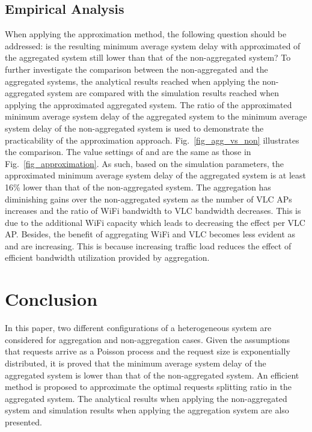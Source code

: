 \documentclass[10pt,journal]{IEEEtran}
\begin{document}
\subsection{Empirical Analysis}
When applying the approximation method, the following question should be addressed: is the resulting minimum average system delay with approximated  of the aggregated system still lower than that of the non-aggregated system? To further investigate the comparison between the non-aggregated and the aggregated systems, the analytical results reached when applying the non-aggregated system are compared with the simulation results reached when applying the approximated aggregated system. The ratio of the approximated minimum average system delay of the aggregated system to the minimum average system delay of the non-aggregated system is used to demonstrate the practicability of the approximation approach. Fig.~\ref{fig_agg_vs_non} illustrates the comparison. The value settings of  and  are the same as those in Fig.~\ref{fig_approximation}. As such, based on the simulation parameters, the approximated minimum average system delay of the aggregated system is at least 16\% lower than that of the non-aggregated system. The aggregation has diminishing gains over the non-aggregated system as the number of VLC APs increases and the ratio of WiFi bandwidth to VLC bandwidth decreases. This is due to the additional WiFi capacity which leads to decreasing the effect per VLC AP. Besides, the benefit of aggregating WiFi and VLC becomes less evident as  and  are increasing. This is because increasing traffic load reduces the effect of efficient bandwidth utilization provided by aggregation.

\section{Conclusion}\label{sec4}
In this paper, two different configurations of a heterogeneous system are considered for aggregation and non-aggregation cases. Given the assumptions that requests arrive as a Poisson process and the request size is exponentially distributed, it is proved that the minimum average system delay of the aggregated system is lower than that of the non-aggregated system. An efficient method is proposed to approximate the optimal requests splitting ratio in the aggregated system. The analytical results when applying the non-aggregated system and simulation results when applying the aggregation system are also presented.





\end{document}

